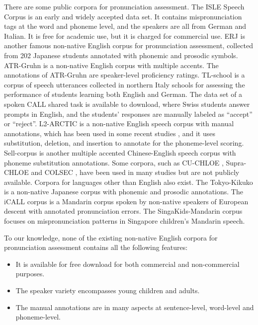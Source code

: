 \documentclass[a4paper]{article}
\begin{document}
There are some public corpora for pronunciation assessment. 
The ISLE Speech Corpus \cite{menzel2000isle} is an early and widely accepted \cite{oba2003using,honig2012automatic,papi2020mixtures} data set. It contains mispronunciation tags at the word and phoneme level, and the speakers are all from German and Italian. It is free for academic use, but it is charged for commercial use.
ERJ \cite{minematsu2004development} is another famous non-native English corpus for pronunciation assessment, collected from 202 Japanese students annotated with phonemic and prosodic symbols.
ATR-Gruhn \cite{gruhn2004multi} is a non-native English corpus with multiple accents. The annotations of ATR-Gruhn are speaker-level proficiency ratings.
TL-school \cite{gretter2020tlt} is a corpus of speech utterances collected in northern Italy schools for assessing the performance of students learning both English and German.
The data set of a spoken CALL shared task \cite{baur2017overview} is available to download, where Swiss students answer prompts in English, and the students' responses are manually labeled as ``accept'' or ``reject''.
L2-ARCTIC \cite{zhao2018l2} is a non-native English speech corpus with manual annotations, which has been used in some recent studies \cite{yan2020end,feng2020sed}, and it uses substitution, deletion, and insertion to annotate for the phoneme-level scoring.
Sell-corpus \cite{chen2019sell} is another multiple accented Chinese-English speech corpus with phoneme substitution annotations.
Some corpora, such as CU-CHLOE \cite{li2016mispronunciation}, Supra-CHLOE \cite{li2011design} and COLSEC \cite{yang2005construction}, have been used in many studies \cite{luo2011improvement,li2013lexical,li2017intonation,li2018automatic} but are not publicly available.
Corpora for languages other than English also exist. The Tokyo-Kikuko \cite{nishina2004development} is a non-native Japanese corpus with phonemic and prosodic annotations.
The iCALL corpus \cite{chen2015icall} is a Mandarin corpus spoken by non-native speakers of European descent with annotated pronunciation errors.
The SingaKids-Mandarin \cite{shang2012singapore} corpus focuses on mispronunciation patterns in Singapore children’s Mandarin speech.

To our knowledge, none of the existing non-native English corpora for pronunciation assessment contains all the following features:
\begin{itemize}
\item It is available for free download for both commercial and non-commercial purposes.
\item The speaker variety encompasses young children and adults.
\item The manual annotations are in many aspects at sentence-level, word-level and phoneme-level.
\end{itemize}
\end{document}
